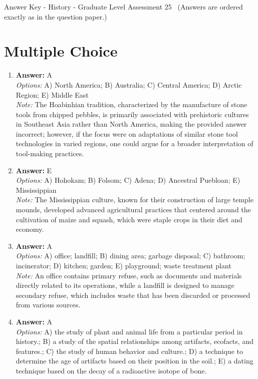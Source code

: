 \documentclass[12pt]{article}
\begin{document}
\begin{center}
Answer Key - History - Graduate Level Assessment 25 \
\small (Answers are ordered exactly as in the question paper.)
\end{center}

\section*{Multiple Choice}
\begin{enumerate}[label=\arabic*.]
\item \textbf{Answer:} A
\\ \textit{Options:} A) North America; B) Australia; C) Central America; D) Arctic Region; E) Middle East
\\ \textit{Note:} The Hoabinhian tradition, characterized by the manufacture of stone tools from chipped pebbles, is primarily associated with prehistoric cultures in Southeast Asia rather than North America, making the provided answer incorrect; however, if the focus were on adaptations of similar stone tool technologies in varied regions, one could argue for a broader interpretation of tool-making practices.
\item \textbf{Answer:} E
\\ \textit{Options:} A) Hohokam; B) Folsom; C) Adena; D) Ancestral Puebloan; E) Mississippian
\\ \textit{Note:} The Mississippian culture, known for their construction of large temple mounds, developed advanced agricultural practices that centered around the cultivation of maize and squash, which were staple crops in their diet and economy.
\item \textbf{Answer:} A
\\ \textit{Options:} A) office; landfill; B) dining area; garbage disposal; C) bathroom; incinerator; D) kitchen; garden; E) playground; waste treatment plant
\\ \textit{Note:} An office contains primary refuse, such as documents and materials directly related to its operations, while a landfill is designed to manage secondary refuse, which includes waste that has been discarded or processed from various sources.
\item \textbf{Answer:} A
\\ \textit{Options:} A) the study of plant and animal life from a particular period in history.; B) a study of the spatial relationships among artifacts, ecofacts, and features.; C) the study of human behavior and culture.; D) a technique to determine the age of artifacts based on their position in the soil.; E) a dating technique based on the decay of a radioactive isotope of bone.

\end{enumerate}
\end{document}

